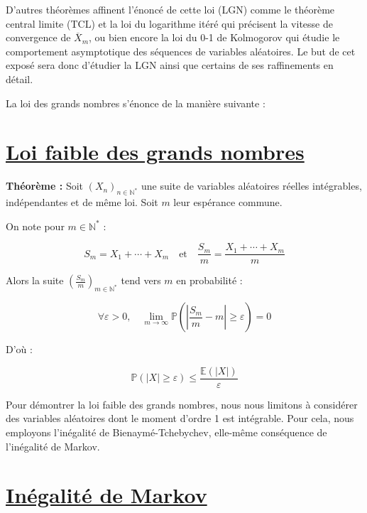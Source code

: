 \documentclass{article}
\begin{document}
\begin{justify}
\noindent
D'autres théorèmes affinent l'énoncé de cette loi (LGN) comme le théorème central limite (TCL) et la loi du logarithme itéré qui précisent la vitesse de convergence de $\overline{X}_m$, ou bien encore la loi du 0-1 de Kolmogorov qui étudie le comportement asymptotique des séquences de variables aléatoires. Le but de cet exposé sera donc d’étudier la LGN ainsi que certains de ses raffinements en détail.
\end{justify}

\begin{justify}
\noindent
La loi des grands nombres s'énonce de la manière suivante :
\end{justify}

\vspace{0.1cm}

\section*{\underline{Loi faible des grands nombres}}


\textbf{Théorème :} Soit $(X_n)_{n \in \mathbb{N}^*}$ une suite de variables aléatoires réelles intégrables, indépendantes et de même loi. Soit $m$ leur espérance commune.

\vspace{0.3cm}
On note pour $m \in \mathbb{N}^*$ :

\[
S_m = X_1 + \cdots + X_m \quad \text{et} \quad \frac{S_m}{m} = \frac{X_1 + \cdots + X_m}{m}
\]

Alors la suite $\left(\frac{S_m}{m}\right)_{m \in \mathbb{N}^*}$ tend vers $m$ en probabilité :

\[
\forall \varepsilon > 0, \quad \lim_{m \to \infty} \mathbb{P}\left(\left|\frac{S_m}{m} - m\right| \geq \varepsilon\right) = 0
\]

D'où :

\[
\mathbb{P}(|X| \geq \varepsilon) \leq \frac{\mathbb{E}(|X|)}{\varepsilon}
\]

\begin{justify}
Pour démontrer la loi faible des grands nombres, nous nous limitons à considérer des variables aléatoires dont le moment d'ordre 1 est intégrable. Pour cela, nous employons l'inégalité de Bienaymé-Tchebychev, elle-même conséquence de l'inégalité de Markov.
\end{justify}

\section*{\underline{Inégalité de Markov}}
\end{document}
